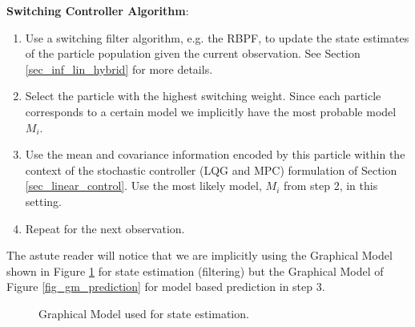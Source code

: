 \textbf{Switching Controller Algorithm}:
\begin{enumerate}
\item
Use a switching filter algorithm, e.g. the RBPF, to update the state estimates of the particle population given the current observation. See Section \ref{sec_inf_lin_hybrid} for more details.
\item
Select the particle with the highest switching weight. Since each particle corresponds to a certain model we implicitly have the most probable model $M_i$.
\item
Use the mean and covariance information encoded by this particle within the context of the stochastic controller (LQG and MPC) formulation of Section \ref{sec_linear_control}. Use the most likely model, $M_i$ from step 2, in this setting.
\item
Repeat for the next observation. 
\end{enumerate} 
The astute reader will notice that we are implicitly using the Graphical Model shown in Figure \ref{fig_gm_filter} for state estimation (filtering) but the Graphical Model of Figure \ref{fig_gm_prediction} for model based prediction in step 3.
\begin{figure}[H] 
\centering
{}
\caption{Graphical Model used for state estimation.}
\label{fig_gm_filter}
\end{figure}
